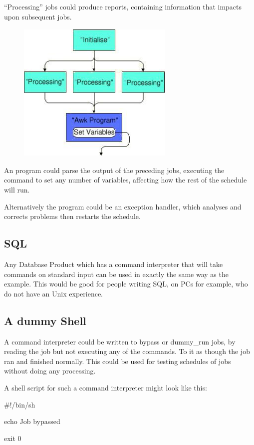 ``Processing'' jobs could produce reports, containing information that impacts upon subsequent jobs.

\begin{figure}
\centering
\includegraphics[width=7.459cm,height=6.747cm]{img/diag2.jpg}
\end{figure}
An  program could parse the output of the preceding jobs, executing the \PrBtvar{} command to set any number of
variables, affecting how the rest of the schedule will run.

Alternatively the  program could be an exception handler, which analyses and corrects problems then restarts
the schedule.

\bigskip

\subsection{SQL}
Any Database Product which has a command interpreter that will take commands on standard input can be used in exactly the same way as the
 example. This would be good for people writing SQL, on PCs for example, who do not have an Unix experience.

\subsection{A dummy Shell}
A command interpreter could be written to bypass or dummy\_run jobs, by reading the job but not executing any of the commands. To \ProductName{} it as though the job ran and finished normally. This could be used for testing schedules of jobs without doing any processing.

A shell script for such a command interpreter might look like this:

\begin{expara}

\#!/bin/sh

echo Job bypassed

exit 0

\end{expara}

